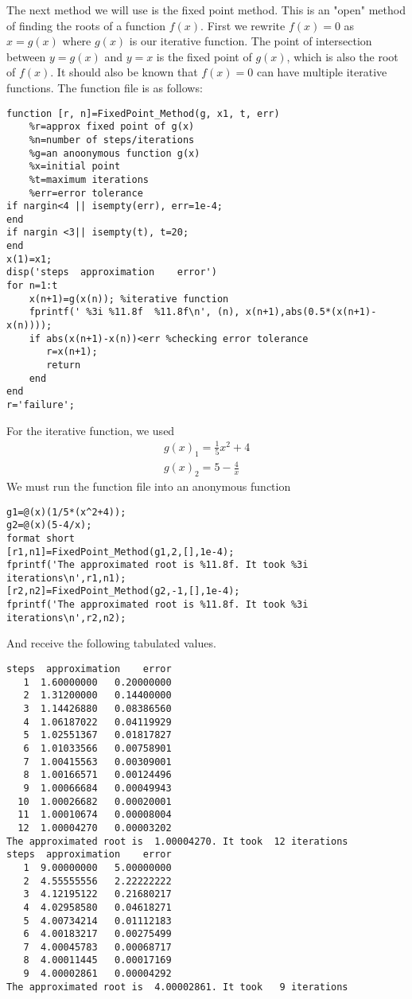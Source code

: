 \documentclass[12pt]{article}
\begin{document}

The next method we will use is the fixed point method. This is an "open" method of finding the roots of a function $f(x)$. First we rewrite $f(x)=0$ as $x=g(x)$ where $g(x)$ is our iterative function. The point of intersection between $y=g(x)$ and $y=x$ is the fixed point of $g(x)$, which is also the root of $f(x)$. It should also be known that $f(x)=0$ can have multiple iterative functions. The function file is as follows:

\begin{lstlisting}[style=Matlab-editor]
function [r, n]=FixedPoint_Method(g, x1, t, err)
    %r=approx fixed point of g(x)
    %n=number of steps/iterations
    %g=an anoonymous function g(x)
    %x=initial point
    %t=maximum iterations
    %err=error tolerance
if nargin<4 || isempty(err), err=1e-4;
end
if nargin <3|| isempty(t), t=20;
end
x(1)=x1;
disp('steps  approximation    error')
for n=1:t
    x(n+1)=g(x(n)); %iterative function
    fprintf(' %3i %11.8f  %11.8f\n', (n), x(n+1),abs(0.5*(x(n+1)-x(n)))); 
    if abs(x(n+1)-x(n))<err %checking error tolerance
       r=x(n+1);
       return
    end
end
r='failure';

\end{lstlisting}
For the iterative function, we used
\begin{gather*}
g(x)_{1}=\frac{1}{5}x^2+4 \\
g(x)_{2}=5-\frac{4}{x}
\end{gather*}
We must run the function file into an anonymous function
\begin{lstlisting}[style=Matlab-editor]
g1=@(x)(1/5*(x^2+4));
g2=@(x)(5-4/x);
format short
[r1,n1]=FixedPoint_Method(g1,2,[],1e-4);
fprintf('The approximated root is %11.8f. It took %3i iterations\n',r1,n1);
[r2,n2]=FixedPoint_Method(g2,-1,[],1e-4);
fprintf('The approximated root is %11.8f. It took %3i iterations\n',r2,n2);
\end{lstlisting}
And receive the following tabulated values.
\begin{lstlisting}[style=Matlab-editor]
steps  approximation    error
   1  1.60000000   0.20000000
   2  1.31200000   0.14400000
   3  1.14426880   0.08386560
   4  1.06187022   0.04119929
   5  1.02551367   0.01817827
   6  1.01033566   0.00758901
   7  1.00415563   0.00309001
   8  1.00166571   0.00124496
   9  1.00066684   0.00049943
  10  1.00026682   0.00020001
  11  1.00010674   0.00008004
  12  1.00004270   0.00003202
The approximated root is  1.00004270. It took  12 iterations
steps  approximation    error
   1  9.00000000   5.00000000
   2  4.55555556   2.22222222
   3  4.12195122   0.21680217
   4  4.02958580   0.04618271
   5  4.00734214   0.01112183
   6  4.00183217   0.00275499
   7  4.00045783   0.00068717
   8  4.00011445   0.00017169
   9  4.00002861   0.00004292
The approximated root is  4.00002861. It took   9 iterations
   \end{lstlisting}
\pagebreak
\end{document}
